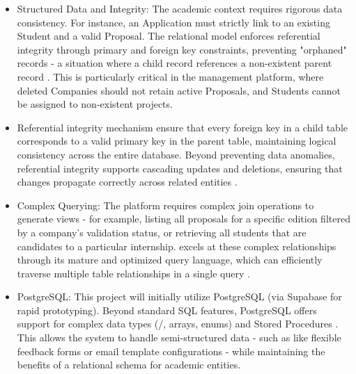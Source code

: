         \begin{itemize}
            \item {
                Structured Data and Integrity: The academic context requires rigorous data consistency.
                For instance, an Application must strictly link to an existing Student and a valid Proposal.
                The relational model enforces referential integrity through primary and foreign key constraints, preventing "orphaned" records - 
                a situation where a child record references a non-existent parent record \cite{referential-integrity-1990}. This is particularly critical in the  management platform, 
                where deleted Companies should not retain active Proposals, and Students cannot be assigned to non-existent projects.
            }
            \item {
                Referential integrity mechanism ensure that every foreign key in a child table corresponds to a valid primary key in the parent table,
                maintaining logical consistency across the entire database. Beyond preventing data anomalies, referential integrity supports cascading
                updates and deletions, ensuring that changes propagate correctly across related entities \cite{ibm-db2-foreignkey-121, referential-integrity-1990}. 
            }
            \item {
                Complex Querying: The platform requires complex join operations to generate views - for example, listing all proposals for a specific edition
                filtered by a company's validation status, or retrieving all students that are candidates to a particular internship.  excels at these complex 
                relationships through its mature and optimized query language, which can efficiently traverse multiple table relationships in a single query \cite{microsoft-sql-joins-2025}.
            }
            \item{
                PostgreSQL: This project will initially utilize PostgreSQL (via Supabase for rapid prototyping). Beyond standard SQL features, PostgreSQL offers support for
                complex data types (/, arrays, enums) and Stored Procedures \cite{postgres-jsonb-docs, postgresql-json-18}. This allows the system to handle semi-structured data - such as
                like flexible feedback forms or email template configurations - while maintaining the benefits of a relational schema for academic entities.
            }
        \end{itemize}


